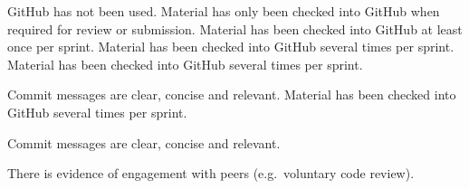 \documentclass{../fal_assignment}
\begin{document}
\begin{markingrubric}
        \grade\fail GitHub has not been used.
        \grade Material has only been checked into GitHub when required for review or submission.
        \grade Material has been checked into GitHub at least once per sprint.
        \grade Material has been checked into GitHub several times per sprint.
        \grade Material has been checked into GitHub several times per sprint.
            \par Commit messages are clear, concise and relevant.
        \grade Material has been checked into GitHub several times per sprint.
            \par Commit messages are clear, concise and relevant.
            \par There is evidence of engagement with peers (e.g.\ voluntary code review).
\end{markingrubric}
\end{document}
